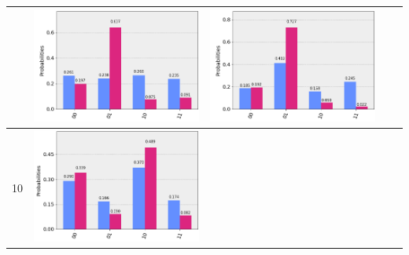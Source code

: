 \documentclass[11pt]{article}
\begin{document}
\begin{table}[h!]
\begin{tabular}{| c | c | c | c | c | }
\begin{minipage}{.215\textwidth}
    \end{minipage}
    &\begin{minipage}{.215\textwidth}
    \includegraphics[width=\linewidth]{img/rand_qecc3_Z01.png}
    \end{minipage}
    &\begin{minipage}{.215\textwidth}
    \includegraphics[width=\linewidth]{img/rand_qecc3_I01.png}
    \end{minipage}
    \\ \hline
    10 & 
    \begin{minipage}{.215\textwidth}
    \includegraphics[width=\linewidth]{img/rand_qecc3_X10.png}

\end{minipage}
\end{tabular}
\end{table}
\end{document}
